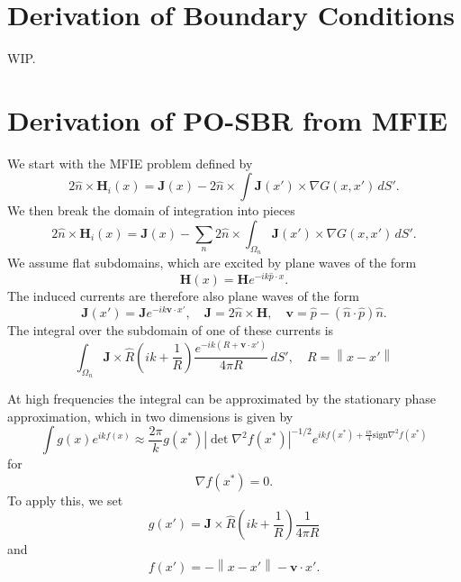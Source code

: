 \documentclass{article}
\newcommand{\norm}[1]{\left\lVert #1 \right\rVert}
\newcommand{\abs}[1]{\left\lvert #1 \right\rvert}
\theoremstyle{plain}
\begin{document}


\section{Derivation of Boundary Conditions}

WIP.



\section{Derivation of PO-SBR from MFIE}

We start with the MFIE problem defined by
\begin{equation}
	2\hat{n}\times\mathbf{H}_i(x)
	= \mathbf{J}(x)
	- 2\hat{n}\times\int \mathbf{J}(x') \times \nabla G(x,x') \,dS'.
\end{equation}
We then break the domain of integration into pieces
\begin{equation}
	2\hat{n}\times\mathbf{H}_i(x)
	= \mathbf{J}(x)
	- \sum_n 2\hat{n}\times\int_{\Omega_n} \mathbf{J}(x') \times \nabla G(x,x') \,dS'.
\end{equation}
We assume flat subdomains, which are excited by plane waves of the form
\begin{equation}
	\mathbf{H}(x) = \mathbf{H}e^{-ik \hat{p} \cdot x}.
\end{equation}
The induced currents are therefore also plane waves of the form
\begin{equation}
	\mathbf{J}(x') = \mathbf{J}e^{-ik \mathbf{v} \cdot x'},
	\quad \mathbf{J} = 2\hat{n}\times\mathbf{H},
	\quad \mathbf{v} = \hat{p} - \left( \hat{n}\cdot\hat{p} \right)\hat{n}.
\end{equation}
The integral over the subdomain of one of these currents is
\begin{equation}
	\int_{\Omega_n}
	\mathbf{J} \times \hat{R}
	\left( ik + \frac{1}{R} \right)
	\frac{e^{-ik\left(R + \mathbf{v} \cdot x'\right)}}{4\pi R} \,dS',
	\quad R = \norm{x-x'}
\end{equation}



At high frequencies the integral can be approximated by the stationary phase approximation,
which in two dimensions is given by
\begin{equation}
	\int g(x) e^{ikf(x)}
	\approx \frac{2\pi}{k} g(x^*)
	\abs{\det \nabla^2 f(x^*)}^{-1/2}
	e^{ikf(x^*) + \frac{i\pi}{4}\text{sign}\nabla^2 f(x^*)}
\end{equation}
for
\begin{equation}
	\nabla f(x^*) = 0.
\end{equation}
To apply this, we set
\begin{equation}
	g(x') = 
	\mathbf{J} \times \hat{R}
	\left( ik + \frac{1}{R} \right)
	\frac{1}{4\pi R}
\end{equation}
and
\begin{equation}
	f(x') = -\norm{x-x'} - \mathbf{v}\cdot x'.
\end{equation}
\end{document}
